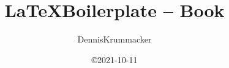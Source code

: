 %
\newcommand{\DenKrTPtitle}{%
\LaTeX Boilerplate -- Book%
}%
\newcommand{\DenKrTPsubtitle}{%
i.e. big Documents with lots of pages. Additional structuring level "Chapter" available.
}%
\newcommand{\DenKrTPtitleGer}{%
\DenKrTPtitle%
}%
\newcommand{\DenKrTPsubtitleGer}{%
d.h für große Dokumente mit vielen Seiten. Zusätzlich ist das Strukturierungs-Level "Kapitel" verfügbar.
}%
\newcommand{\DenKrTPpublicationType}{Template}%
\newcommand{\DenKrTPpublicationTypeGer}{Template}%
\newcommand{\DenKrTPauthorAnrede}{}%
\newcommand{\DenKrTPauthorTitleBefore}{}%
\newcommand{\DenKrTPauthorTitleAfter}{M.Sc.}%
\newcommand{\DenKrTPauthorFirst}{Dennis}%
\newcommand{\DenKrTPauthorLast}{Krummacker}%
\newcommand{\DenKrTPauthorStreet}{Albert-Schweitzer-Str. 57}%
\newcommand{\DenKrTPauthorPLZ}{67655}%
\newcommand{\DenKrTPauthorCity}{Kaiserslautern}%
\newcommand{\DenKrTPauthorMail}{dennis.krummacker@gmail.com}%
\newcommand{\DenKrTPsignedAtCity}{Kaiserslautern}%
\newcommand{\DenKrTPsupervisorOneAnrede}{}%
\newcommand{\DenKrTPsupervisorOneTitleBefore}{Prof. Dr.-Ing.}%
\newcommand{\DenKrTPsupervisorOneTitleAfter}{}%
\newcommand{\DenKrTPsupervisorOneFirst}{Hans D.}%
\newcommand{\DenKrTPsupervisorOneLast}{Schotten}%
\newcommand{\DenKrTPsupervisorTwoAnrede}{}%
\newcommand{\DenKrTPsupervisorTwoTitleBefore}{Prof. Dr.}%
\newcommand{\DenKrTPsupervisorTwoTitleAfter}{}%
\newcommand{\DenKrTPsupervisorTwoFirst}{FName}%
\newcommand{\DenKrTPsupervisorTwoLast}{LName}%
\newcommand{\DenKrTPsupervisorThreeAnrede}{}%
\newcommand{\DenKrTPsupervisorThreeTitleBefore}{}%
\newcommand{\DenKrTPsupervisorThreeTitleAfter}{}%
\newcommand{\DenKrTPsupervisorThreeFirst}{}%
\newcommand{\DenKrTPsupervisorThreeLast}{}%
\newcommand{\DenKrTPdeanAnrede}{}%
\newcommand{\DenKrTPdeanTitleBefore}{Prof. Dr. rer. nat.}%
\newcommand{\DenKrTPdeanTitleAfter}{}%
\newcommand{\DenKrTPdeanFirst}{Marco}%
\newcommand{\DenKrTPdeanLast}{Rahm}%
\newcommand{\DenKrTPauditchairAnrede}{}%
\newcommand{\DenKrTPauditchairTitleBefore}{Prof. Dr.-Ing.}%
\newcommand{\DenKrTPauditchairTitleAfter}{}%
\newcommand{\DenKrTPauditchairFirst}{Norbert}%
\newcommand{\DenKrTPauditchairLast}{Wehn}%
\newcommand{\DenKrTPoralExamdate}{2022-01-01}%
\newcommand{\DenKrTPdate}{2021-10-11}%
%
%
%
%
%
%
%
\title{\DenKrTPtitle}%
\author{\DenKrTPauthorFirst \DenKrTPauthorLast}%
\date{\copyright \DenKrTPdate}%